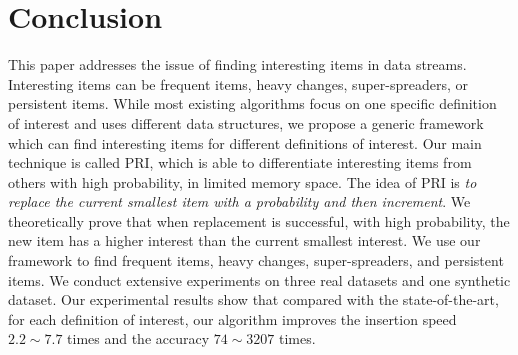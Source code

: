\uuu \vspace{0.01in}
\section{Conclusion} %
\label{sec:conclusion}


This paper addresses the issue of finding interesting items in data streams. Interesting items can be frequent items, heavy changes, super-spreaders, or persistent items.
%
While most existing algorithms focus on one specific definition of interest and uses different data structures, we propose a generic framework which can find interesting items for different definitions of interest.
%
Our main technique is called PRI, which is able to differentiate interesting items from others with high probability, in limited memory space. 
	The idea of PRI is \textit{to replace the current smallest item with a probability and then increment}.
	We theoretically prove that when replacement is successful, with high probability, the new item has a higher interest than the current smallest interest. 
	We use our framework to find frequent items, heavy changes, super-spreaders, and persistent items.
	We conduct extensive experiments on three real datasets and one synthetic dataset.
	Our experimental results show that compared with the state-of-the-art, for each definition of interest, our algorithm improves the insertion speed $2.2\sim 7.7$ times and the accuracy $74\sim 3207$ times.
